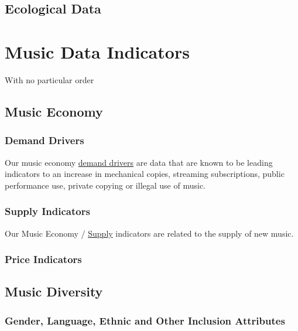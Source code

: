 \documentclass[
  a4paper,
  openany, a4paper, oneside]{book}
\begin{document}
\hypertarget{ecological-data}{%
\section{Ecological Data}\label{ecological-data}}

\hypertarget{music-data}{%
\chapter{Music Data Indicators}\label{music-data}}

With no particular order

\hypertarget{music-economy}{%
\section{Music Economy}\label{music-economy}}

\hypertarget{demand-drivers}{%
\subsection{Demand Drivers}\label{demand-drivers}}

Our music economy \href{https://data.music.dataobservatory.eu/music-economy.html}{demand drivers} are data that are known to be leading indicators to an increase in mechanical copies, streaming subscriptions, public performance use, private copying or illegal use of music.

\hypertarget{supply-indicators}{%
\subsection{Supply Indicators}\label{supply-indicators}}

Our Music Economy / \href{https://data.music.dataobservatory.eu/music-economy.html\#supply}{Supply} indicators are related to the supply of new music.

\hypertarget{price-indicators}{%
\subsection{Price Indicators}\label{price-indicators}}

\hypertarget{music-diversity}{%
\section{Music Diversity}\label{music-diversity}}

\hypertarget{gender-language-ethnic-and-other-inclusion-attributes}{%
\subsection{Gender, Language, Ethnic and Other Inclusion Attributes}\label{gender-language-ethnic-and-other-inclusion-attributes}}
\end{document}
